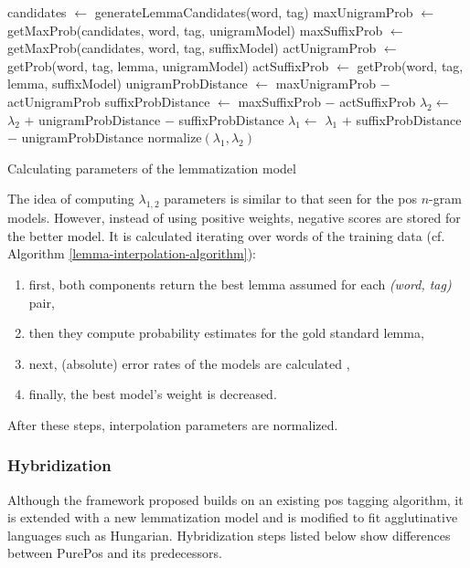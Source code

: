 \begin{algorithm*}
\begin{algorithmic}
        \State candidates $\gets$ generateLemmaCandidates(word, tag)
        \State maxUnigramProb $\gets$ getMaxProb(candidates, word, tag, unigramModel)
        \State maxSuffixProb $\gets$ getMaxProb(candidates, word, tag, suffixModel)
        \State actUnigramProb $\gets$ getProb(word, tag, lemma, unigramModel)
        \State actSuffixProb $\gets$ getProb(word, tag, lemma, suffixModel)
        \State unigramProbDistance $\gets$ maxUnigramProb $-$ actUnigramProb
        \State suffixProbDistance $\gets$ maxSuffixProb $-$ actSuffixProb
            \State $\lambda_{2} \gets$ $\lambda_{2}$ $+$ unigramProbDistance $-$ suffixProbDistance
        \Else%
            \State $\lambda_{1} \gets$ $\lambda_{1}$ $+$ suffixProbDistance $-$ unigramProbDistance
        \EndIf
    \EndFor
    \State normalize$( \lambda_{1}, \lambda_{2} )$
  \end{algorithmic}
  \caption{Calculating parameters of the lemmatization model}
\label{lemma-interpolation-algorithm}
\end{algorithm*}

The idea of computing $\lambda_{1,2}$ parameters is similar to that seen for the \gls{pos} $n$-gram models. 
However, instead of using positive weights, negative scores are stored for the better model.  
It is calculated iterating over words of the training data (cf. Algorithm \ref{lemma-interpolation-algorithm}):
\begin{enumerate}
  \item first, both components return the best lemma assumed for each \emph{(word, tag)} pair, 
  \item then they compute probability estimates for the gold standard lemma,
  \item next, (absolute) error rates of the models are calculated ,
  \item finally, the best model’s weight is decreased.
\end{enumerate}
After these steps, interpolation parameters are normalized.


\subsubsection{Hybridization}

Although the framework proposed builds on an existing \gls{pos} tagging algorithm, it is extended with a new lemmatization model and is modified to fit agglutinative languages such as Hungarian. 
Hybridization steps listed below show differences between PurePos and its predecessors.

